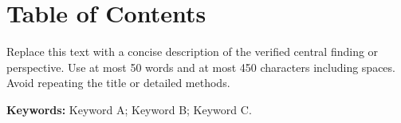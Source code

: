 \documentclass[serif,twocolumn]{prism-wiley-article}
\begin{document}
\clearpage
\onecolumn
\section*{Table of Contents}
\begin{center}
\begingroup
\setlength{\fboxsep}{0pt}
\endgroup
\end{center}
Replace this text with a concise description of the verified central
finding or perspective. Use at most 50 words and at most 450 characters
including spaces. Avoid repeating the title or detailed methods.

\medskip
\noindent\textbf{Keywords:} Keyword A; Keyword B; Keyword C.
\end{document}
